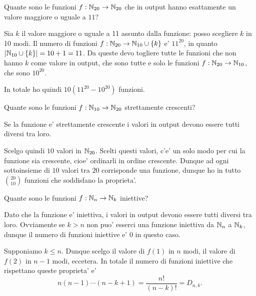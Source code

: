 \begin{example}
    Quante sono le funzioni $f : \mathbb{N}_{20} \to \mathbb{N}_{20}$ che in output hanno esattamente un valore maggiore o uguale a $11$?
\end{example}
\begin{solution}
    Sia $k$ il valore maggiore o uguale a 11 assunto dalla funzione: posso scegliere $k$ in 10 modi. Il numero di funzioni $f : \mathbb{N}_{20} \to \mathbb{N}_{10} \cup \{k\}$ e' $11^{20}$, in quanto $\left|\mathbb{N}_{10} \cup \{k\}\right| = 10 + 1 = 11$. Da queste devo togliere tutte le funzioni che non hanno $k$ come valore in output, che sono tutte e solo le funzioni $f : \mathbb{N}_{20} \to \mathbb{N}_{10}$, che sono $10^{20}$.

    In totale ho quindi $10(11^{20} - 10^{20})$ funzioni.
\end{solution}

\begin{example}
    Quante sono le funzioni $f : \mathbb{N}_{10} \to \mathbb{N}_{20}$ strettamente crescenti?
\end{example}
\begin{solution}
    Se la funzione e' strettamente crescente i valori in output devono essere tutti diversi tra loro.

    Scelgo quindi $10$ valori in $\mathbb{N}_{20}$. Scelti questi valori, c'e' un solo modo per cui la funzione sia crescente, cioe' ordinarli in ordine crescente. Dunque ad ogni sottoinsieme di $10$ valori tra $20$ corrisponde una funzione, dunque ho in tutto $\binom{20}{10}$ funzioni che soddisfano la proprieta'.
\end{solution}

\begin{example}
    Quante sono le funzioni $f : \mathbb{N}_n \to \mathbb{N}_k$ iniettive?
\end{example}
\begin{solution}
    Dato che la funzione e' iniettiva, i valori in output devono essere tutti diversi tra loro. Ovviamente se $k > n$ non puo' esserci una funzione iniettiva da $\mathbb{N}_n$ a $\mathbb{N}_k$, dunque il numero di funzioni iniettive e' 0 in questo caso.

    Supponiamo $k \leq n$. Dunque scelgo il valore di $f(1)$ in $n$ modi, il valore di $f(2)$ in $n-1$ modi, eccetera. In totale il numero di funzioni iniettive che rispettano queste proprieta' e' \[
        n(n-1) \cdots (n-k+1) = \frac{n!}{(n-k)!} = D_{n, k}.    
    \]
\end{solution}

